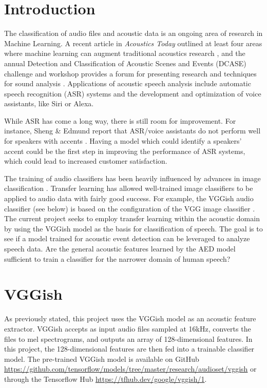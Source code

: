 \section{Introduction}

The classification of audio files and acoustic data is an ongoing area of research in Machine Learning. A recent article in \textit{Acoustics Today} outlined at least four areas where machine learning can augment traditional acoustics research \cite{AT}, and the annual Detection and Classification of Acoustic Scenes and Events (DCASE) challenge and workshop provides a forum for presenting research and techniques for sound analysis \cite{DCASE}. Applications of acoustic speech analysis include automatic speech recognition (ASR) systems and the development and optimization of voice assistants, like Siri or Alexa.

While ASR has come a long way, there is still room for improvement. For instance, Sheng \& Edmund report that ASR/voice assistants do not perform well for speakers with accents \cite{Sheng}. Having a model which could identify a speakers' accent could be the first step in improving the performance of ASR systems, which could lead to increased customer satisfaction.

The training of audio classifiers has been heavily influenced by advances in image classification \cite{Hershey}. Transfer learning has allowed well-trained image classifiers to be applied to audio data with fairly good success. For example, the VGGish audio classifier (see below) is based on the configuration of the VGG image classifier \cite{Hershey, VGG}. The current project seeks to employ transfer learning within the acoustic domain by using the VGGish model as the basis for classification of speech.  The goal is to see if a model trained for acoustic event detection can be leveraged to analyze speech data. Are the general acoustic features learned by the AED model sufficient to train a classifier for the narrower domain of human speech?
\section{VGGish}
As previously stated, this project uses the VGGish model as an acoustic feature extractor.  VGGish accepts as input audio files sampled at 16kHz, converts the files to mel spectrograms, and outputs an array of 128-dimensional features. In this project, the 128-dimensional features are then fed into a trainable classifier model. The pre-trained VGGish model is available on GitHub \url{https://github.com/tensorflow/models/tree/master/research/audioset/vggish} or through the Tensorflow Hub \url{https://tfhub.dev/google/vggish/1}.

